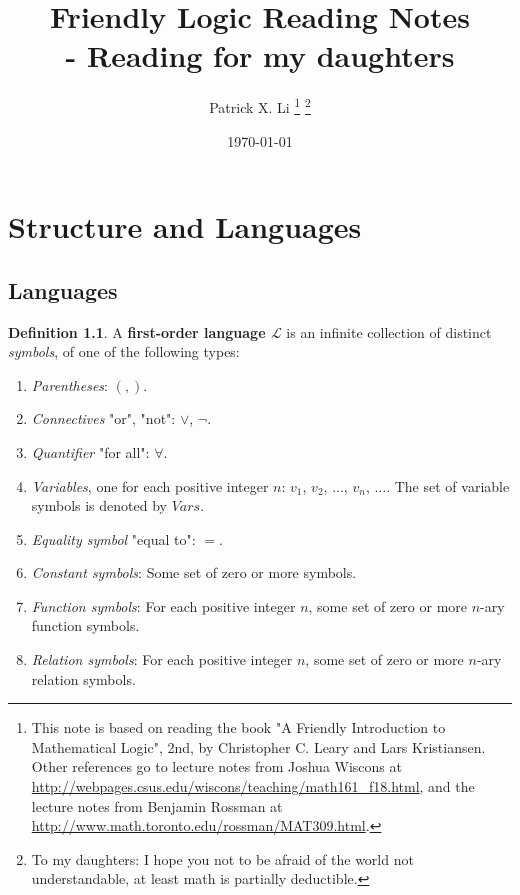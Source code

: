 \documentclass[11pt,letterpaper]{book}
\theoremstyle{definition}
\newtheorem{definition}{Definition}[section]
\begin{document}
\title{Friendly Logic Reading Notes \\  {\Large - Reading for my daughters} }
\date{\today}
\author{Patrick X. Li \thanks{This note is based on reading the book "A Friendly Introduction to Mathematical Logic", 2nd, by Christopher C. Leary and Lars Kristiansen. Other references go to lecture notes from Joshua Wiscons at \url{http://webpages.csus.edu/wiscons/teaching/math161_f18.html}, and the lecture notes from Benjamin Rossman at \url{http://www.math.toronto.edu/rossman/MAT309.html}.} \thanks{To my daughters: I hope you not to be afraid of the world not understandable, at least math is partially deductible.} }


\maketitle

\tableofcontents


\chapter{Structure and Languages}


\section{Languages}



\begin{definition}\label{def:language}
A \textbf{first-order language $\mathcal{L}$} is an infinite collection
of distinct \emph{symbols}, of one of the following types:
\begin{enumerate}
\item{\emph{Parentheses}: $( , )$.}
\item{\emph{Connectives} "or", "not": $\lor $, $\lnot$.}
\item{\emph{Quantifier} "for all": $\forall$.}
\item{\emph{Variables}, one for each positive integer $n$: $v_1$, $v_2$,
$\ldots$, $v_n$, $\ldots$. The set of variable symbols is denoted by
$Vars$.}
\item{\emph{Equality symbol} "equal to": $=$.}
\item{\emph{Constant symbols}: Some set of zero or more symbols.}
\item{\emph{Function symbols}: For each positive integer $n$, some set
of zero or more $n$-ary function symbols.}
\item{\emph{Relation symbols}: For each positive integer $n$, some set
of zero or more $n$-ary relation symbols.}
\end{enumerate}

\end{definition}
\end{document}
